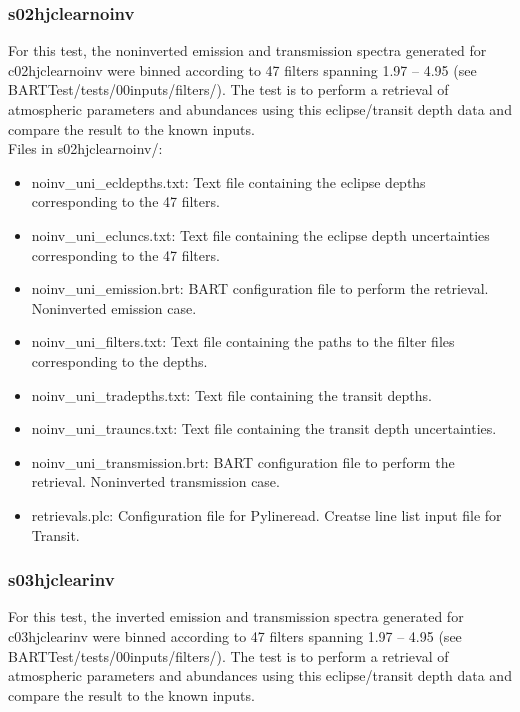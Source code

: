 \documentclass[letterpaper, 12pt]{article}
\begin{document}
\subsubsection{s02hjclearnoinv}
For this test, the noninverted emission and transmission spectra generated for 
c02hjclearnoinv were binned according to 47 filters spanning 
1.97 -- 4.95 \microns (see BARTTest/tests/00inputs/filters/). 
The test 
is to perform a retrieval of atmospheric parameters and abundances using this 
eclipse/transit depth data and compare the result to the known inputs.\\

Files in s02hjclearnoinv/:
\begin{itemize} \itemsep0pt
  \item noinv{\_}uni{\_}ecldepths.txt: Text file containing the eclipse depths 
        corresponding to the 47 filters.
  \item noinv{\_}uni{\_}ecluncs.txt: Text file containing the eclipse depth 
        uncertainties corresponding to the 47 filters.
  \item noinv{\_}uni{\_}emission.brt: BART configuration file to perform the 
        retrieval. Noninverted emission case.
  \item noinv{\_}uni{\_}filters.txt: Text file containing the paths to the filter files corresponding to the depths.
  \item noinv{\_}uni{\_}tradepths.txt: Text file containing the transit depths.
  \item noinv{\_}uni{\_}trauncs.txt: Text file containing the transit depth 
        uncertainties. 
  \item noinv{\_}uni{\_}transmission.brt: BART configuration file to perform the 
        retrieval. Noninverted transmission case.
  \item retrievals.plc: Configuration file for Pylineread. Creatse line list input file for Transit.
\end{itemize}

\subsubsection{s03hjclearinv}
For this test, the inverted emission and transmission spectra generated for 
c03hjclearinv were binned according to 47 filters spanning 
1.97 -- 4.95 \microns (see BARTTest/tests/00inputs/filters/). 
The test 
is to perform a retrieval of atmospheric parameters and abundances using this 
eclipse/transit depth data and compare the result to the known inputs.\\
\end{document}
